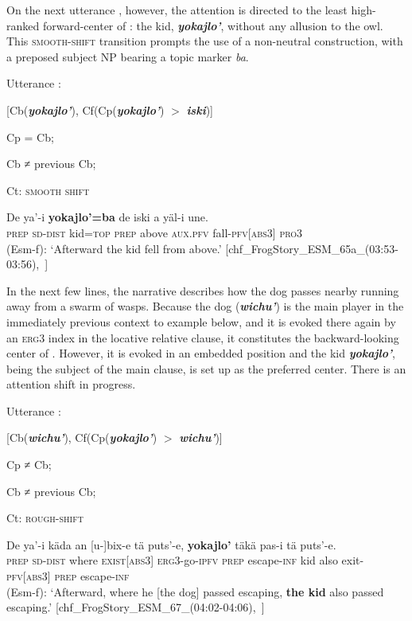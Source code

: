 \documentclass[output=paper
,modfonts
,nonflat]{langsci/langscibook}
\begin{document}
\z

On the next utterance , however, the attention is directed to the least high-ranked forward-center of : the kid, \textbf{\textit{yokajlo'}}, without any allusion to the owl. This \textsc{smooth-shift} transition prompts the use of a non-neutral construction, with a preposed subject NP bearing a topic marker \textit{ba}. 

\ea
Utterance :

[Cb(\textbf{\textit{yokajlo'}}), Cf(Cp(\textbf{\textit{yokajlo'}}) $>$ \textbf{\textit{iski}})]

Cp = Cb;

Cb ≠ previous Cb; 

Ct: \textsc{smooth shift}
\z

\ea \label{ex:pico:29}

\gll De ya'-i \textbf{yokajlo'=ba} de iski a yäl-i une. \\
\textsc{prep} \textsc{sd-dist} kid=\textsc{top} \textsc{prep} above \textsc{aux.pfv} fall-\textsc{pfv[abs3]} \textsc{pro3}\\
\glt (Esm-f): `Afterward the kid fell from above.' [chf\_FrogStory\_ESM\_65a\_(03:53-03:56),~\citealt{Delgado-Galvan2018archive}]
\z

In the next few lines, the narrative describes how the dog passes nearby running away from a swarm of wasps. Because the dog (\textbf{\textit{wichu'}}) is the main player in the immediately previous context to example  below, and it is evoked there again by an \textsc{erg3} index in the locative relative clause, it constitutes the backward-looking center of . However, it is evoked in an embedded position and the kid \textbf{\textit{yokajlo'}}, being the subject of the main clause, is set up as the preferred center. There is an attention shift in progress.

\ea
Utterance :

[Cb(\textbf{\textit{wichu'}}), Cf(Cp(\textbf{\textit{yokajlo'}}) $>$ \textbf{\textit{wichu'}})]

Cp ≠ Cb;

Cb ≠ previous Cb; 

Ct: \textsc{rough-shift}
\z


\ea \label{ex:pico:31}

\gll De ya'-i käda an [u-]bix-e tä puts'-e, \textbf{yokajlo'} täkä pas-i tä puts'-e. \\
\textsc{prep} \textsc{sd-dist} where \textsc{exist[abs3]} \textsc{erg3}-go-\textsc{ipfv} \textsc{prep} escape-\textsc{inf} kid also exit-\textsc{pfv[abs3]} \textsc{prep} escape-\textsc{inf} \\
\glt (Esm-f): `Afterward, where he [the dog] passed escaping, \textbf{the kid} also passed escaping.' [chf\_FrogStory\_ESM\_67\_(04:02-04:06),~\citealt{Delgado-Galvan2018archive}]
\z
\end{document}
